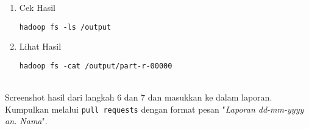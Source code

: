 \documentclass[a4paper]{tufte-handout}
\begin{document}
\begin{enumerate}
\item Cek Hasil
\begin{lstlisting}[language=Terminal]
 hadoop fs -ls /output
\end{lstlisting} 

\item Lihat Hasil
\begin{lstlisting}[language=Terminal]
 hadoop fs -cat /output/part-r-00000
\end{lstlisting} 
\end{enumerate}

 \\
Screenshot hasil dari langkah 6 dan 7 dan masukkan ke dalam laporan. Kumpulkan melalui {\tt pull requests} dengan format pesan "\textit{Laporan dd-mm-yyyy an. Nama}".

\hrulefill

\clearpage
\begin{comment}
\newday{\#11 - 16 Desember 2022 menggantikan 17 November 2022
\footnote{Mahasiswa yang hadir:
\begin{enumerate}
\item Adinda Awaliah
\item Adjie Yusmunandar
\item Faiza Yuwafiqi
\item Jihan Dwi Sarah
\item M. Ikhsan
\item Nurani Harum Fardaniah
\item Nuraula Tafiza
\item Nurul Aflah
\item Rauzatinur Syah
\item Resha Russita
\item Rizki Ilhami
\item Salsabila Irmanda
\item Taravia Fauzah
\item Zulfahmi
\end{enumerate}}}
\end{comment}
\end{document}
